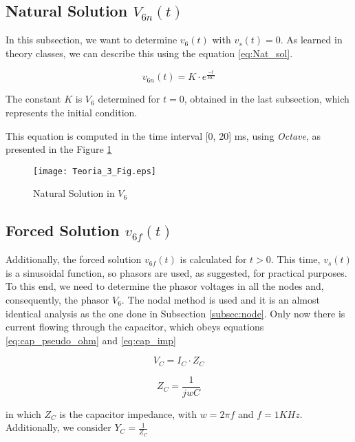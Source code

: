 \subsection{Natural Solution $V_{6n}(t)$}
\label{subsec:Nat_Sol_theory}

In this subsection, we want to determine $v_6 (t)$ with $v_s(t) = 0$. As learned in theory classes, we can describe this using the equation \ref{eq:Nat_sol}.

\begin{equation}
  v_{6n}(t) = K \cdot e^{\frac{-t}{RC}}
  \label{eq:Nat_sol}
\end{equation}

The constant $K$ is $V_6$ determined for $t=0$, obtained in the last subsection, which represents the initial condition.

This equation is computed in the time interval [0, 20] ms, using \textit{Octave}, as presented in the Figure \ref{plot3}

\begin{figure}[h]
\centering
\caption{Natural Solution in $V_6$}
\texttt{[image: Teoria\_3\_Fig.eps]}
\label{plot3}
\end{figure}

\newpage


\subsection{Forced Solution $v_{6f}(t)$}
\label{subsec:Forced_Sol_theory}

Additionally, the forced solution $v_{6f}(t)$ is calculated for $t>0$. This time, $v_s(t)$ is a sinusoidal function, so phasors are used, as suggested, for practical purposes. To this end, we need to determine the phasor voltages in all the nodes and, consequently, the phasor $V_6$. The nodal method is used and it is an almost identical analysis as the one done in Subsection \ref{subsec:node}. Only now there is current flowing through the capacitor, which obeys equations \ref{eq:cap_pseudo_ohm} and \ref{eq:cap_imp}

\begin{equation}
  V_C = I_C \cdot Z_C
  \label{eq:cap_pseudo_ohm}
\end{equation}

\begin{equation}
  Z_C = \frac{1}{jwC}
  \label{eq:cap_imp}
\end{equation}

in which $Z_C$ is the capacitor impedance, with $w = 2\pi f$ and $f=1 KHz$. Additionally, we consider $Y_C = \frac{1}{Z_C}$


